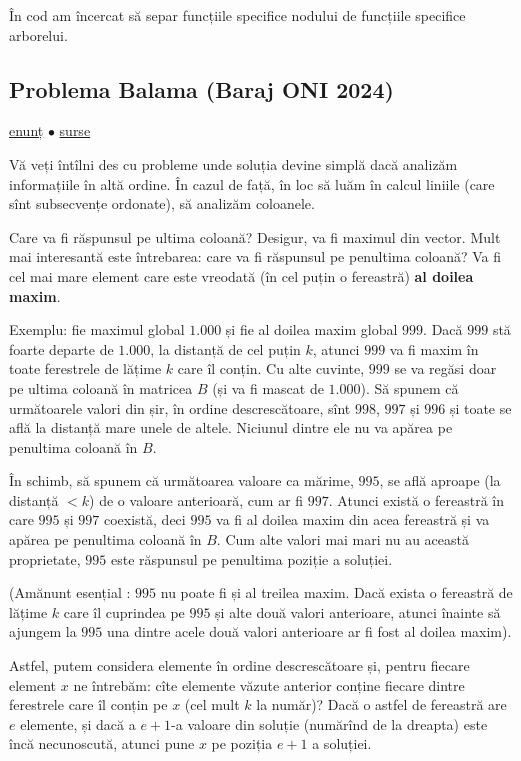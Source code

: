În cod am încercat să separ funcțiile specifice nodului de funcțiile specifice arborelui.

\subsection{Problema Balama (Baraj ONI 2024)}
\label{problem:balama}

\href{https://kilonova.ro/problems/2666}{enunț}
$\bullet$
\hyperref[code:balama]{surse}

Vă veți întîlni des cu probleme unde soluția devine simplă dacă analizăm informațiile în altă ordine. În cazul de față, în loc să luăm în calcul liniile (care sînt subsecvențe ordonate), să analizăm coloanele.

Care va fi răspunsul pe ultima coloană? Desigur, va fi maximul din vector. Mult mai interesantă este întrebarea: care va fi răspunsul pe penultima coloană? Va fi cel mai mare element care este vreodată (în cel puțin o fereastră) \textbf{al doilea maxim}.

Exemplu: fie maximul global $1.000$ și fie al doilea maxim global $999$. Dacă $999$ stă foarte departe de $1.000$, la distanță de cel puțin $k$, atunci $999$ va fi maxim în toate ferestrele de lățime $k$ care îl conțin. Cu alte cuvinte, $999$ se va regăsi doar pe ultima coloană în matricea $B$ (și va fi mascat de $1.000$). Să spunem că următoarele valori din șir, în ordine descrescătoare, sînt $998$, $997$ și $996$ și toate se află la distanță mare unele de altele. Niciunul dintre ele nu va apărea pe penultima coloană în $B$.

În schimb, să spunem că următoarea valoare ca mărime, $995$, se află aproape (la distanță $< k$) de o valoare anterioară, cum ar fi $997$. Atunci există o fereastră în care $995$ și $997$ coexistă, deci $995$ va fi al doilea maxim din acea fereastră și va apărea pe penultima coloană în $B$. Cum alte valori mai mari nu au această proprietate, $995$ este răspunsul pe penultima poziție a soluției.

(Amănunt esențial : $995$ nu poate fi și al treilea maxim. Dacă exista o fereastră de lățime $k$ care îl cuprindea pe $995$ și alte două valori anterioare, atunci înainte să ajungem la $995$ una dintre acele două valori anterioare ar fi fost al doilea maxim).

Astfel, putem considera elemente în ordine descrescătoare și, pentru fiecare element $x$ ne întrebăm: cîte elemente văzute anterior conține fiecare dintre ferestrele care îl conțin pe $x$ (cel mult $k$ la număr)? Dacă o astfel de fereastră are $e$ elemente, și dacă a $e+1$-a valoare din soluție (numărînd de la dreapta) este încă necunoscută, atunci pune $x$ pe poziția $e+1$ a soluției.

